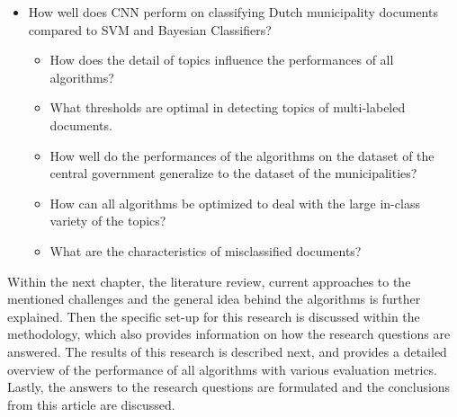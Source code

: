 \begin{itemize}
\item How well does CNN perform on classifying Dutch municipality documents compared to SVM and Bayesian Classifiers? 
\begin{itemize}
\item How does the detail of topics influence the performances of all algorithms?
\item What thresholds are optimal in detecting topics of multi-labeled documents.
\item How well do the performances of the algorithms on the dataset of the central government generalize to the dataset of the municipalities?
\item How can all algorithms be optimized to deal with the large in-class variety of the topics?
\item What are the characteristics of misclassified documents?
\end{itemize}
\end{itemize}
Within the next chapter, the literature review, current approaches to the mentioned challenges and the general idea behind the algorithms is further explained. Then the specific set-up for this research is discussed within the methodology, which also provides information on how the research questions are answered. The results of this research is described next, and provides a detailed overview of the performance of all algorithms with various evaluation metrics. Lastly, the answers to the research questions are formulated and the conclusions from this article are discussed.

